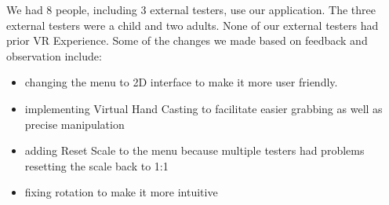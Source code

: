 We had 8 people, including 3 external testers, use our application.  The three external testers were a child and two adults.  None of our external testers had prior VR Experience.  
Some of the changes we made based on feedback and observation include:
\begin{itemize}
  \item changing the menu to 2D interface to make it more user friendly.
  \item implementing Virtual Hand Casting to facilitate easier grabbing as well as precise manipulation
  \item adding Reset Scale to the menu because multiple testers had problems resetting the scale back to 1:1
  \item fixing rotation to make it more intuitive
\end{itemize}
